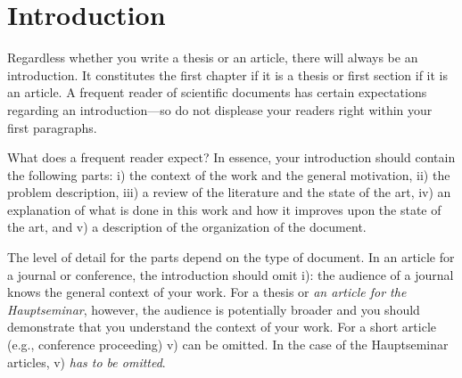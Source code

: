 \section{Introduction} %
Regardless whether you write a thesis or an article, there will always be an introduction. 
It constitutes the first chapter if it is a thesis or first section if it is an article.
A frequent reader of scientific documents has certain expectations regarding an introduction---so do not displease your readers right within your first paragraphs.

What does a frequent reader expect? In essence, your introduction should contain the following parts: 
i) the context of the work and the general motivation, ii) the problem description, iii) a review of the literature and the state of the art, iv) an explanation of what is done in this work and how it improves upon the state of the art, and v) a description of the organization of the document.

The level of detail for the parts depend on the type of document. 
In an article for a journal or conference, the introduction should omit i): the audience of a journal knows the general context of your work. 
For a thesis or \emph{an article for the Hauptseminar}, however, the audience is potentially broader and you should demonstrate that you understand the context of your work.
For a short article (e.g., conference proceeding)  v) can be omitted. 
In the case of the Hauptseminar articles, v) \emph{has to be omitted}.

